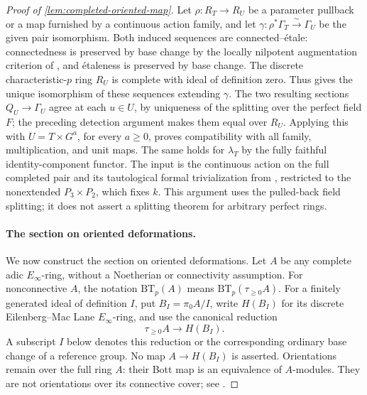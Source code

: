 \documentclass[11pt]{article}
\numberwithin{equation}{section}
\theoremstyle{definition}
\theoremstyle{remark}
\begin{document}
\begin{proof}[Proof of \cref{lem:completed-oriented-map}]
Let \(\rho:R_T\to R_U\) be a parameter pullback or a map furnished by a
continuous action family, and let
\(\gamma:\rho^*\Gamma_T\xrightarrow{\sim}\Gamma_U\) be the given pair
isomorphism. Both induced sequences are connected--étale: connectedness
is preserved by base change by the locally nilpotent augmentation
criterion of \cite[Remark~2.3.8]{LurieEllipticII2018}, and étaleness is
preserved by base change. The discrete characteristic-\(p\) ring \(R_U\)
is complete with ideal of definition zero. Thus
\cite[Theorem~2.5.13]{LurieEllipticII2018} gives the unique isomorphism of
these sequences extending \(\gamma\). The two resulting sections
\(Q_U\to\Gamma_U\) agree at each \(u\in U\), by uniqueness of the splitting
over the perfect field \(F\); the preceding detection argument makes them
equal over \(R_U\). Applying this with \(U=T\times G^a\), for every
\(a\geq0\), proves compatibility with all family, multiplication, and unit
maps. The same holds for \(\lambda_T\) by the fully faithful
identity-component functor. The input is the continuous action on the
full completed pair and its tautological formal trivialization from
\cite[Examples~4.6.3--4.6.4]{BMR2026}, restricted to the nonextended
\(P_3\times P_2\), which fixes \(k\). This argument uses the pulled-back
field splitting; it does not assert a splitting theorem for arbitrary
perfect rings.

\paragraph{The section on oriented deformations.}
We now construct the section on oriented deformations. Let \(A\) be any
complete adic \(E_\infty\)-ring, without a Noetherian or connectivity
assumption. For nonconnective \(A\), the notation \(\mathrm{BT}_p(A)\)
means \(\mathrm{BT}_p(\tau_{\geq0}A)\). For a finitely generated ideal of
definition \(I\), put \(B_I=\pi_0A/I\), write \(H(B_I)\) for its discrete
Eilenberg--Mac Lane \(E_\infty\)-ring, and use the canonical reduction
\[
 \tau_{\geq0}A\longrightarrow H(B_I).
\]
A subscript \(I\) below denotes this reduction or the corresponding
ordinary base change of a reference group. No map \(A\to H(B_I)\) is
asserted. Orientations remain over
the full ring \(A\): their Bott map is an equivalence of \(A\)-modules.
They are not orientations over its connective cover; see
\cite[Warning~4.3.12]{LurieEllipticII2018}.


\end{proof}
\end{document}
